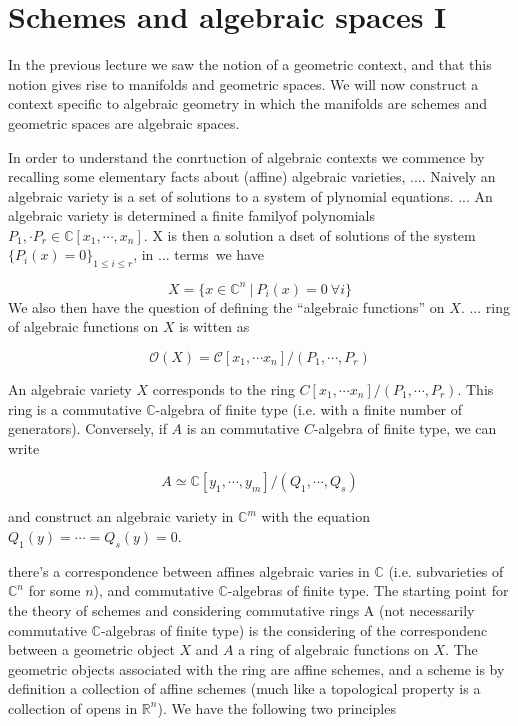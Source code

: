 \documentclass[../main.tex]{subfiles}
\begin{document}
\setcounter{chapter}{3}

\section{Schemes and algebraic spaces I}

In the previous lecture we saw the notion of a geometric context, and that this notion gives rise to manifolds and geometric spaces. We will now construct a context specific to algebraic geometry in which the manifolds are schemes and geometric spaces are algebraic spaces.


In order to understand the conrtuction of algebraic contexts we commence by recalling some elementary facts about (affine) algebraic varieties, .... Naively an algebraic variety is a set of solutions to a system of plynomial equations. ... An algebraic variety is determined a finite familyof polynomials $P_1, \cdot P_r \in \mathbb C[x_1, \cdots, x_n]$. X is then a solution a dset of solutions of the system $\{P_i(x) = 0\}_{1 \le i \le r}$, in ... terms we have

\[
X = \{ x \in \mathbb C^n ~|~ P_i(x) = 0 ~ \forall i\}
\]
We also then have the question of defining the ``algebraic functions'' on $X$. ... ring of algebraic functions on $X$ is witten as

\[
\mathcal O(X) = \mathcal C[x_1, \cdots x_n] / (P_1, \cdots, P_r)
\]

An algebraic variety $X$ corresponds to the ring $C[x_1, \cdots x_n] / (P_1, \cdots, P_r)$. This ring is a commutative $\mathbb C$-algebra of finite type (i.e. with a finite number of generators). Conversely, if $A$ is an commutative $C$-algebra of finite type, we can write

\[
A \simeq \mathbb C[y_1, \cdots, y_m]/(Q_1, \cdots, Q_s)
\]

and construct an algebraic variety in $\mathbb C^m$ with the equation $Q_1(y) = \cdots = Q_s(y) = 0$.


there's a correspondence between affines algebraic varies in $\mathbb C$ (i.e. subvarieties of $\mathbb C^n$ for some $n$), and commutative $\mathbb C$-algebras of finite type. The starting point for the theory of schemes and considering commutative rings A (not necessarily commutative $\mathbb C$-algebras of finite type) is the considering of the correspondenc between a geometric object $X$ and $A$ a ring of algebraic functions on $X$. The geometric objects associated with the ring are affine schemes, and a scheme is by definition a collection of affine schemes (much like a topological property is a collection of opens in $\mathbb R^n$). We have the following two principles
\end{document}
